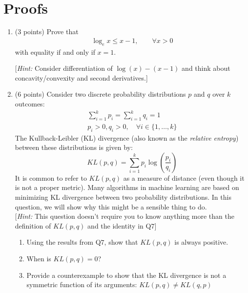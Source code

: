 \section{Proofs}

\begin{enumerate}[resume]
\item (3 points) Prove that
%
\begin{align}
\log_e x\leq x-1, \qquad \forall x>0
\end{align}
%
with equality if and only if $x=1$.

[\emph{Hint:} Consider differentiation of $\log(x)-(x-1)$ and think about concavity/convexity and second derivatives.]
\pagebreak
\item (6 points)
Consider two discrete probability distributions $p$ and $q$ over $k$ outcomes:
%
\begin{subequations}
\begin{align}
\sum_{i=1}^k p_i = \sum_{i=1}^k q_i=1 \\
p_i > 0, q_i > 0, \quad \forall i \in \{1,\ldots,k\}
\end{align}
\end{subequations}
%
The Kullback-Leibler (KL) divergence (also known as the \emph{relative entropy}) between these distributions is given by:
%
\begin{equation}
KL(p,q)=\sum_{i=1}^{k} p_i\log\left(\frac{p_i}{q_i}\right)
\end{equation}
%
It is common to refer to $KL(p,q)$ as a measure of distance (even though it is not a proper metric).
Many algorithms in machine learning are based on minimizing KL divergence between two
probability distributions.
In this question, we will show why this might be a sensible thing to do.\\

[\emph{Hint:} This question doesn't require you to know anything more than the definition of $KL(p,q)$ and the identity
in Q$7$]

\begin{enumerate}
\item Using the results from Q$7$, show that $KL(p,q)$ is always positive.
\pagebreak
\item When is $KL(p,q) = 0$?
\pagebreak
\item Provide a counterexample to show that the KL divergence is not a symmetric function of its arguments: $KL(p,q) \neq KL(q,p)$
\end{enumerate}


\end{enumerate}
